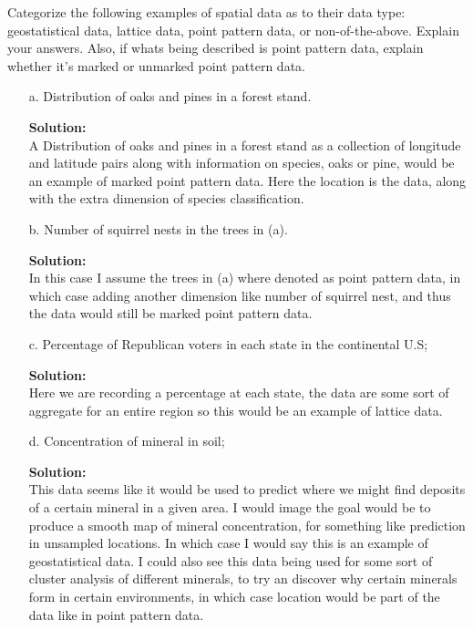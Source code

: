 \documentclass[12pt]{article}
\makeatletter
\theoremstyle{homework}
\newenvironment{exercise}[1]
{\def\@currentlabel{#1}\exercisecore}
{\endexercisecore}
\newcommand{\localhead}[1]{\par\smallskip\noindent\textbf{#1}\nobreak\\}%
\newcommand\solution{\localhead{Solution:}}
\makeatother
\begin{document}
\begin{exercise}{1} Categorize the following examples of spatial data as to their data type: geostatistical data, lattice data, 
    point pattern data, or non-of-the-above. Explain your answers. Also, if whats being described is point pattern data, explain whether it's marked or unmarked point pattern 
    data.\\
    \begin{enumerate}
        \item[a.] Distribution of oaks and pines in a forest stand.\\
        \solution A Distribution of oaks and pines in a forest stand as a collection of longitude and latitude pairs along with information on species, 
        oaks or pine,  would be an example of marked point pattern data. Here the location is the data, along with the extra dimension of species classification. 
        \vspace{.15in} 
        \item[b.] Number of squirrel nests in the trees in (a).\\
        \solution In this case I assume the trees in (a) where denoted as point pattern data, in which case adding another dimension like 
        number of squirrel nest, and thus the data would still be marked point pattern data. 
        \vspace{.15in} 
        \item[c.] Percentage of Republican voters in each state in the continental U.S;\\
        \solution Here we are recording a percentage at each state, the data are some sort of aggregate for an entire region so this would be an example of lattice data. 
        \vspace{.15in} 
        \item[d.] Concentration of mineral in soil;\\
        \solution This data seems like it would be used to predict where we might find deposits of a certain mineral in a given area. I would image 
        the goal would be to produce a smooth map of mineral concentration, for something like prediction in unsampled locations. In which case I would say 
        this is an example of geostatistical data. I could also see this data being used for some sort of cluster analysis of different minerals, to try an discover why 
        certain minerals form in certain environments, in which case location would be part of the data like in point pattern data. 
        \vspace{.15in} 

\end{enumerate}
\end{exercise}
\end{document}
